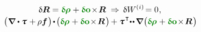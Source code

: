 \nopagebreak\vspace{-0.25em}\begin{equation*}
\begin{array}{c}
\variation{\bm{R}} = \constvarvector{\hspace{-0.1ex}\bm{\rho}} \hspace{.1ex} + \constvarvector{o} \hspace{-0.33ex} \times \hspace{-0.33ex} \bm{R}
\hspace{.66ex}\Rightarrow\hspace{.4ex}
\variation{\internalwork} \hspace{-0.2ex} = 0
\hspace{.1ex} ,
\\[.2em]
%
\bigl( \hspace{.1ex} \boldnabla \dotp \cauchystress \hspace{.1ex} + \hspace{-0.1ex} \rho \bm{f} \hspace{.16ex} \bigr)
\hspace{-0.25ex} \dotp \hspace{-0.25ex}
\bigl(  \constvarvector{\hspace{-0.1ex}\bm{\rho}} \hspace{.1ex} + \constvarvector{o} \hspace{-0.33ex} \times \hspace{-0.33ex} \bm{R} \hspace{.2ex} \bigr) \hspace{-0.16ex}
+ \cauchystress^{\hspace{.16ex}\T} \hspace{-0.5ex}
\dotdotp
\hspace{-0.16ex} \boldnabla \hspace{.1ex} \bigl(
\constvarvector{\hspace{-0.1ex}\bm{\rho}} \hspace{.1ex} +
\constvarvector{o} \hspace{-0.33ex} \times \hspace{-0.33ex} \bm{R} \hspace{.2ex} \bigr) \hspace{-0.25ex}

\end{array}
\end{equation*}
